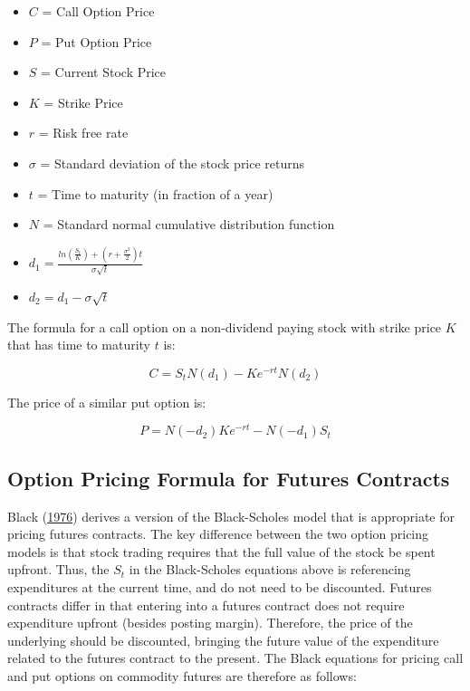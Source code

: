 \documentclass[
]{book}
\begin{document}
\begin{itemize}
\item
  \(C\) = Call Option Price
\item
  \(P\) = Put Option Price
\item
  \(S\) = Current Stock Price
\item
  \(K\) = Strike Price
\item
  \(r\) = Risk free rate
\item
  \(\sigma\) = Standard deviation of the stock price returns
\item
  \(t\) = Time to maturity (in fraction of a year)
\item
  \(N\) = Standard normal cumulative distribution function
\item
  \(d_{1} = \frac{ln(\frac{S_{t}}{K}) + (r + \frac{\sigma^{2}}{2})t}{\sigma \sqrt{t}}\)
\item
  \(d_{2} = d_{1} - \sigma \sqrt{t}\)
\end{itemize}

The formula for a call option on a non-dividend paying stock with strike price \(K\) that has time to maturity \(t\) is:

\[C = S_{t}N(d_{1}) - K e^{-rt} N(d_{2})\]

The price of a similar put option is:

\[
P = N(-d_{2}) K e^{-rt} - N(-d_{1}) S_{t}
\]

\hypertarget{option-pricing-formula-for-futures-contracts}{%
\subsection{Option Pricing Formula for Futures Contracts}\label{option-pricing-formula-for-futures-contracts}}

Black (\protect\hyperlink{ref-black1976}{1976}) derives a version of the Black-Scholes model that is appropriate for pricing futures contracts. The key difference between the two option pricing models is that stock trading requires that the full value of the stock be spent upfront. Thus, the \(S_{t}\) in the Black-Scholes equations above is referencing expenditures at the current time, and do not need to be discounted. Futures contracts differ in that entering into a futures contract does not require expenditure upfront (besides posting margin). Therefore, the price of the underlying should be discounted, bringing the future value of the expenditure related to the futures contract to the present. The Black equations for pricing call and put options on commodity futures are therefore as follows:
\end{document}
